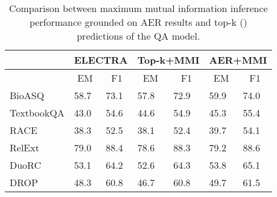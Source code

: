 \documentclass[11pt,a4paper]{article}
\begin{document}
\begin{table}[]
\small
\begin{tabular}{@{}lllllll@{}}
\toprule
           & \multicolumn{2}{c}{\textbf{ELECTRA}}            & \multicolumn{2}{c}{\textbf{Top-k+MMI}}          & \multicolumn{2}{c}{\textbf{AER+MMI}}            \\ \midrule
           & \multicolumn{1}{c}{EM} & \multicolumn{1}{c}{F1} & \multicolumn{1}{c}{EM} & \multicolumn{1}{c}{F1} & \multicolumn{1}{c}{EM} & \multicolumn{1}{c}{F1} \\
           \hdashline[1.5pt/2pt]
BioASQ     & 58.7                   & 73.1                   & 57.8                       & 72.9                       & 59.9                   & 74.0                   \\
TextbookQA & 43.0                   & 54.6                   & 44.6                       & 54.9                       & 45.3                   & 55.4                   \\
RACE       & 38.3                   & 52.5                   & 38.1                       & 52.4                       & 39.7                       & 54.1                       \\
RelExt     & 79.0                   & 88.4                   & 78.6                       & 88.3                       & 79.2                       & 88.6                       \\
DuoRC      & 53.1                   & 64.2                   &  52.6                      & 64.3                       & 53.8                       & 65.1                       \\
DROP       & 48.3                   & 60.8                   & 46.7                       & 60.8                       & 49.7                       & 61.5                       \\ \bottomrule
\end{tabular}
\caption{Comparison between maximum mutual information inference performance grounded on AER results and top-k () predictions of the QA model.}
\label{tab:aer-mmi}
\end{table}
\end{document}
